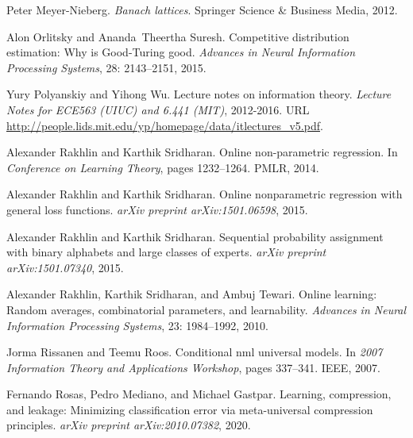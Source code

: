 \documentclass[12pt]{colt2021} %
\theoremstyle{remark}
\begin{document}
\begin{thebibliography}{32}
Peter Meyer-Nieberg.
\newblock \emph{Banach lattices}.
\newblock Springer Science \& Business Media, 2012.

Alon Orlitsky and Ananda~Theertha Suresh.
\newblock Competitive distribution estimation: Why is {G}ood-{T}uring good.
\newblock \emph{Advances in Neural Information Processing Systems},
  28: 2143--2151, 2015.

Yury Polyanskiy and Yihong Wu.
\newblock Lecture notes on information theory.
\newblock \emph{Lecture Notes for ECE563 (UIUC) and 6.441 (MIT)}, 2012-2016.
\newblock URL
  \url{http://people.lids.mit.edu/yp/homepage/data/itlectures_v5.pdf}.

Alexander Rakhlin and Karthik Sridharan.
\newblock Online non-parametric regression.
\newblock In \emph{Conference on Learning Theory}, pages 1232--1264. PMLR,
  2014.

Alexander Rakhlin and Karthik Sridharan.
\newblock Online nonparametric regression with general loss functions.
\newblock \emph{arXiv preprint arXiv:1501.06598}, 2015{}.

Alexander Rakhlin and Karthik Sridharan.
\newblock Sequential probability assignment with binary alphabets and large
  classes of experts.
\newblock \emph{arXiv preprint arXiv:1501.07340}, 2015{}.

Alexander Rakhlin, Karthik Sridharan, and Ambuj Tewari.
\newblock Online learning: Random averages, combinatorial parameters, and
  learnability.
\newblock \emph{Advances in Neural Information Processing Systems},
  23: 1984--1992, 2010.

Jorma Rissanen and Teemu Roos.
\newblock Conditional nml universal models.
\newblock In \emph{2007 Information Theory and Applications Workshop}, pages
  337--341. IEEE, 2007.

Fernando Rosas, Pedro Mediano, and Michael Gastpar.
\newblock Learning, compression, and leakage: Minimizing classification error
  via meta-universal compression principles.
\newblock \emph{arXiv preprint arXiv:2010.07382}, 2020.


\end{thebibliography}
\end{document}
